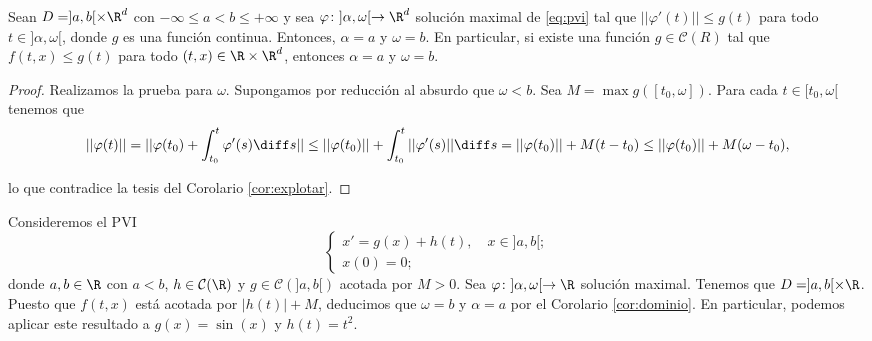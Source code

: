 \documentclass{article}
\begin{document}
\begin{corollary} \label{cor:dominio} Sean $D = ]a,b[ \times \R^d$ con
  $-\infty \le a < b \le +\infty$ y sea $\varphi \colon ]\alpha, \omega[ \to \R^d$ solución maximal
  de \eqref{eq:pvi} tal que $||\varphi'(t)|| \le g(t)$ para todo $t \in ]\alpha, \omega[$, donde $g$
  es una función continua. Entonces, $\alpha =a$ y $\omega = b$. En particular, si existe una
  función $g \in \mathcal{C}(R)$ tal que $f(t,x) \le g(t)$ para todo $(t,x) \in \R \times \R^d$,
  entonces $\alpha = a$ y $\omega = b$.
\end{corollary}
\begin{proof}
  Realizamos la prueba para $\omega$. Supongamos por reducción al absurdo que $\omega < b$. Sea
  $M = \max g([t_0, \omega])$. Para cada $t \in [t_0, \omega[$ tenemos que
  \[ ||\varphi(t)|| = ||\varphi(t_0) + \int_{t_0}^t \varphi'(s) \diff s|| \le ||\varphi(t_0)|| +
    \int_{t_0}^t ||\varphi'(s)|| \diff s = ||\varphi(t_0)|| + M(t - t_0) \le ||\varphi(t_0)|| +
    M(\omega - t_0), \]

  lo que contradice la tesis del Corolario \ref{cor:explotar}.
\end{proof}

\begin{ex} \label{ex:acotar-f} Consideremos el PVI
  \[
    \begin{cases}
      x' = g(x) + h(t), \quad x \in ]a,b[; \\
      x(0) = 0;
    \end{cases}
  \]
  donde $a,b \in \R$ con $a < b$, $h \in \mathcal{C}(\R)$ y $g \in \mathcal{C}(]a,b[)$ acotada por
  $M > 0$. Sea $\varphi \colon ]\alpha, \omega[ \to \R$ solución maximal. Tenemos que
  $D = ]a,b[ \times \R$. Puesto que $f(t,x)$ está acotada por $|h(t)| + M$, deducimos que
  $\omega = b$ y $\alpha = a$ por el Corolario \ref{cor:dominio}. En particular, podemos aplicar
  este resultado a $g(x) = \sin(x)$ y $h(t) = t^2$.
\end{ex}
\end{document}

